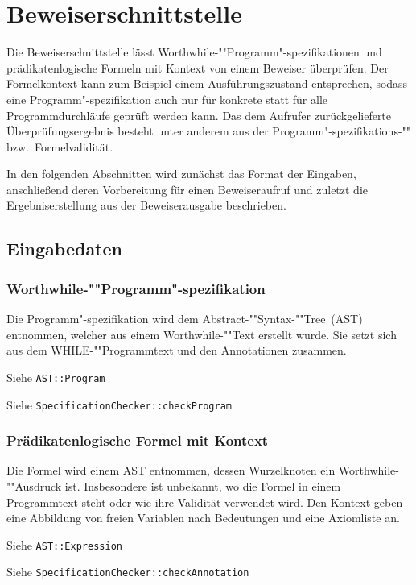 \section{Beweiserschnittstelle}%

Die Beweiserschnittstelle lässt Worthwhile-""Programm"-spezifikationen
und prädikatenlogische Formeln mit Kontext von einem Beweiser
überprüfen. Der Formelkontext kann zum Beispiel einem
Ausführungszustand entsprechen, sodass eine Programm"-spezifikation
auch nur für konkrete statt für alle Programmdurchläufe geprüft werden
kann. Das dem Aufrufer zurückgelieferte Überprüfungsergebnis besteht
unter anderem aus der Programm"-spezifikations-"" bzw.\
Formelvalidität.

In den folgenden Abschnitten wird zunächst das Format der Eingaben,
anschließend deren Vorbereitung für einen Beweiseraufruf und zuletzt
die Ergebniserstellung aus der Beweiserausgabe beschrieben.%

\subsection{Eingabedaten}%

\subsubsection{Worthwhile-""Programm"-spezifikation}%

Die Programm"-spezifikation wird dem Abstract-""Syntax-""Tree~(AST)
entnommen, welcher aus einem Worthwhile-""Text erstellt wurde. Sie
setzt sich aus dem WHILE-""Programmtext und den Annotationen
zusammen.%

Siehe \texttt{AST::Program}%

Siehe \texttt{SpecificationChecker::checkProgram}%

\subsubsection{Prädikatenlogische Formel mit Kontext}%

Die Formel wird einem AST entnommen, dessen Wurzelknoten ein
Worthwhile-""Ausdruck ist. Insbesondere ist unbekannt, wo die Formel
in einem Programmtext steht oder wie ihre Validität verwendet wird.
Den Kontext geben eine Abbildung von freien Variablen nach Bedeutungen
und eine Axiomliste an.%

Siehe \texttt{AST::Expression}%

Siehe \texttt{SpecificationChecker::checkAnnotation}%

